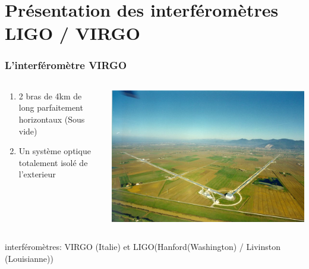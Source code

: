 \documentclass{beamer}
\begin{document}
\section{Présentation des interféromètres LIGO / VIRGO}
\begin{frame}
	\frametitle{L'interféromètre VIRGO}
	\begin{columns}
		\begin{column}{0.5\textwidth}
			\small
			\begin{enumerate}[-]
				\item 2 bras de 4km de long parfaitement horizontaux (Sous vide)
				\item Un système optique  totalement isolé de l'exterieur
			\end{enumerate}
		\end{column}
		\begin{column}{0.5\textwidth}
			\includegraphics[scale=.5]{Docs/virgoview.png}
		\end{column}
	\end{columns}
	 interféromètres: VIRGO (Italie) et LIGO(Hanford(Washington) / Livinston (Louisianne))
\end{frame}
\end{document}
